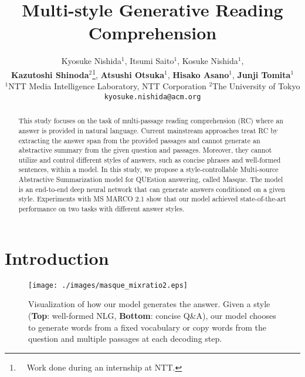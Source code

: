 \documentclass[11pt,a4paper]{article}
\theoremstyle{mydef}
\theoremstyle{myprob}
\begin{document}
\title{Multi-style Generative Reading Comprehension}

\author{Kyosuke Nishida$^1$, 
Itsumi Saito$^1$, 
Kosuke Nishida$^1$, 
\\{\bf Kazutoshi Shinoda}$^2$\thanks{\ \ Work done during an internship at NTT.}, 
{\bf Atsushi Otsuka}$^1$,
{\bf Hisako Asano}$^1$, 
{\bf Junji Tomita}$^1$\\
  $^1$NTT Media Intelligence Laboratory, NTT Corporation \hspace{1.5em}  $^2$The University of Tokyo\\
  {\tt kyosuke.nishida@acm.org}
}

\date{}

\maketitle
\begin{abstract}
This study focuses on the task of multi-passage reading comprehension (RC) where an answer is provided in natural language. Current mainstream approaches treat RC by extracting the answer span from the provided passages and cannot generate an abstractive summary from the given question and passages. Moreover, they cannot utilize and control different styles of answers, such as concise phrases and well-formed sentences, within a model. 
In this study, we propose a style-controllable Multi-source Abstractive Summarization model for QUEstion answering, called Masque. The model is an end-to-end deep neural network that can generate answers conditioned on a given style. 
Experiments with MS MARCO 2.1 show that our model achieved state-of-the-art performance %
on two tasks with different answer styles.
\end{abstract}

\section{Introduction}

\begin{figure}[t!]
\centering
\texttt{[image: ./images/masque\_mixratio2.eps]}
\caption{Visualization of how our model generates the answer. Given a style (\textbf{Top}: well-formed NLG, \textbf{Bottom}: concise Q\&A), our model chooses to generate words from a fixed vocabulary or copy words from the question and multiple passages at each decoding step.
}
\label{fig:mixratio}
\end{figure}
\end{document}
